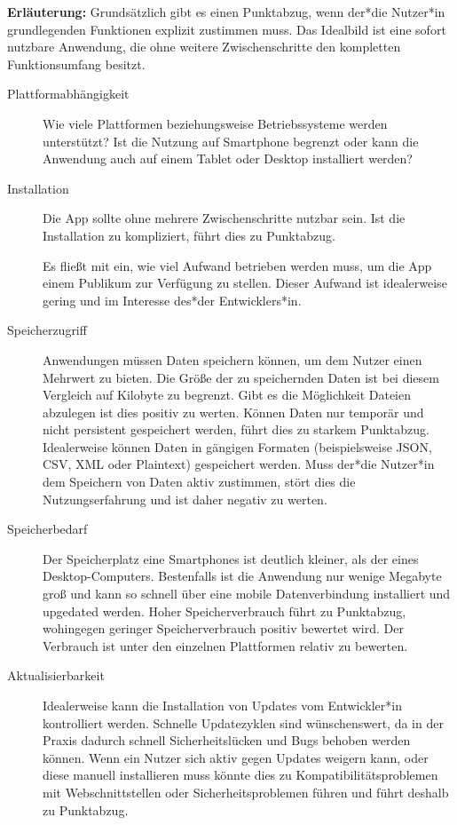 \textbf{Erläuterung:}
Grundsätzlich gibt es einen Punktabzug, wenn der*die Nutzer*in grundlegenden Funktionen explizit zustimmen muss. Das Idealbild ist eine sofort nutzbare Anwendung, die ohne weitere Zwischenschritte den kompletten Funktionsumfang besitzt.
\begin{description}
    \item [Plattformabhängigkeit]    	
    	Wie viele Plattformen beziehungsweise Betriebssysteme werden unterstützt?
    	Ist die Nutzung auf Smartphone begrenzt oder kann die Anwendung auch auf einem Tablet oder Desktop installiert werden?
    	
    \item [Installation]    
    	Die App sollte ohne mehrere Zwischenschritte nutzbar sein. Ist die Installation zu kompliziert, führt dies zu Punktabzug.
    	
    	Es fließt mit ein, wie viel Aufwand betrieben werden muss, um die App einem Publikum zur Verfügung zu stellen. Dieser Aufwand ist idealerweise gering und im Interesse des*der Entwicklers*in.
    
    \item [Speicherzugriff]    
    	Anwendungen müssen Daten speichern können, um dem Nutzer einen Mehrwert zu bieten. Die Größe der zu speichernden Daten ist bei diesem Vergleich auf Kilobyte zu begrenzt. Gibt es die Möglichkeit Dateien abzulegen ist dies positiv zu werten. 
    	Können Daten nur temporär und nicht persistent gespeichert werden, führt dies zu starkem Punktabzug. Idealerweise können Daten in gängigen Formaten (beispielsweise JSON, CSV, XML oder Plaintext) gespeichert werden. Muss der*die Nutzer*in dem Speichern von Daten aktiv zustimmen, stört dies die Nutzungserfahrung und ist daher negativ zu werten.      
    
    \item [Speicherbedarf]
		Der Speicherplatz eine Smartphones ist deutlich kleiner, als der eines Desktop-Computers. Bestenfalls ist die Anwendung nur wenige Megabyte groß und kann so schnell über eine mobile Datenverbindung installiert und upgedated werden.
		Hoher Speicherverbrauch führt zu Punktabzug, wohingegen geringer Speicherverbrauch positiv bewertet wird. Der Verbrauch ist unter den einzelnen Plattformen relativ zu bewerten.
		
	\item [Aktualisierbarkeit]
		Idealerweise kann die Installation von Updates vom Entwickler*in kontrolliert werden. Schnelle Updatezyklen sind wünschenswert, da in der Praxis dadurch schnell Sicherheitslücken und Bugs behoben werden können. Wenn ein Nutzer sich aktiv gegen Updates weigern kann, oder diese manuell installieren muss könnte dies zu Kompatibilitätsproblemen mit Webschnittstellen oder Sicherheitsproblemen führen und führt deshalb zu Punktabzug.
		

\end{description}
